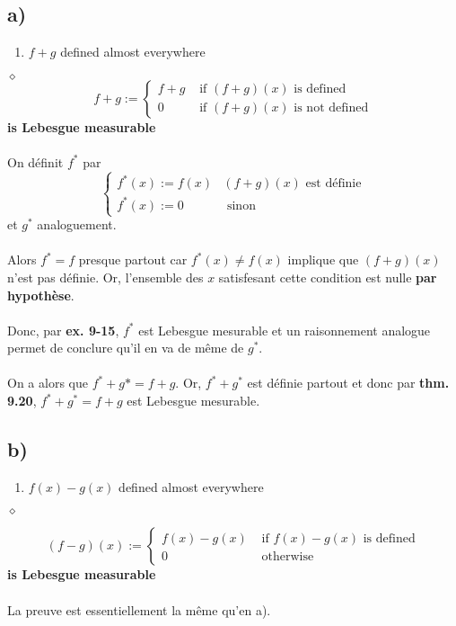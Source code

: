 \documentclass[a4paper,10pt]{article}
\begin{document}
\subsection*{a)}
\begin{enumerate}
	\item $f + g$ defined almost everywhere
\end{enumerate}
$\diamond$ 
$$
	f + g := \begin{cases}
		f + g & \text{ if } (f + g)(x) \text{ is defined} \\
		0 & \text{ if }(f+g)(x) \text{ is not defined}
	\end{cases}
$$
\textbf{is Lebesgue measurable}
\\
\\
On définit $f^*$ par 
$$
	\begin{cases}
		f^*(x) := f(x) & (f+g)(x) \text{ est définie} \\
		f^*(x) := 0 & \text{ sinon}
	\end{cases}
$$
et $g^*$ analoguement. 
\\
\\
Alors $f^* = f$ presque partout car $f^*(x) \not = f(x)$ implique que $(f + g)(x)$ n'est pas définie. Or, l'ensemble des $x$ satisfesant cette condition est nulle \textbf{par hypothèse}. 
\\
\\
Donc, par \textbf{ex. 9-15}, $f^*$ est Lebesgue mesurable et un raisonnement analogue permet de conclure qu'il en va de même de $g^*$. 
\\
\\
On a alors que $f^* + g* = f + g$. Or, $f^* + g^*$ est définie partout et donc par \textbf{thm. 9.20}, $f^* + g^* = f + g$ est Lebesgue mesurable. 

\subsection*{b)}
\begin{enumerate}
	\item $f(x) - g(x)$ defined almost everywhere
\end{enumerate}

$\diamond$ 

$$
	(f - g)(x) :=
	\begin{cases}
		f(x) - g(x) & \text{ if } f(x) - g(x) \text{ is defined} \\
		0 & \text{ otherwise}
	\end{cases}
$$
\textbf{is Lebesgue measurable}
\\
\\
La preuve est essentiellement la même qu'en a). 
\end{document}
